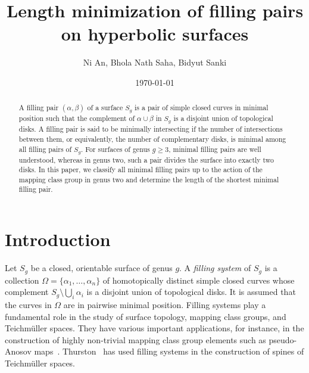 \documentclass[11pt,reqno]{amsart}
\title{Length minimization of filling pairs on hyperbolic surfaces}
\author{Ni An, Bhola Nath Saha, Bidyut Sanki}
\date{\today}
\theoremstyle{plain}
\theoremstyle{definition}
\theoremstyle{remark}
\numberwithin{equation}{section}
\numberwithin{figure}{section}
\begin{document}

\keywords{}

\begin{abstract}
   A filling pair $(\alpha, \beta)$ of a surface $S_g$ is a pair of simple closed curves in minimal position such that the complement of $\alpha\cup\beta$ in $S_g$ is a disjoint union of topological disks. A filling pair is said to be minimally intersecting if the number of intersections between them, or equivalently, the number of complementary disks, is minimal among all filling pairs of $S_g$. For surfaces of genus $g \geq 3$, minimal filling pairs are well understood, whereas in genus two, such a pair divides the surface into exactly two disks. In this paper, we classify all minimal filling pairs up to the action of the mapping class group in genus two and determine the length of the shortest minimal filling pair.

\end{abstract}

\maketitle

  
\section{Introduction}
Let $S_g$ be a closed, orientable surface of genus $g$.  A \emph{filling system} of $S_g$ is a collection $\Omega=\{ \alpha_1, \dots, \alpha_n \}$ of homotopically distinct simple closed curves whose complement $S_g \setminus \bigcup_i \alpha_i$ is a disjoint union of topological disks. It is assumed that the curves in $\Omega$ are in pairwise minimal position. Filling systems play a fundamental role in the study of surface topology, mapping class groups, and Teichm\"uller spaces. They have various important applications, for instance, in the construction of highly non-trivial mapping class group elements such as pseudo-Anosov maps~\cite{FathiLaudenbachPoenaru2012, Penner}. Thurston~\cite{thurstonspine} has used filling systems in the construction of spines of Teichmüller spaces.
\end{document}
